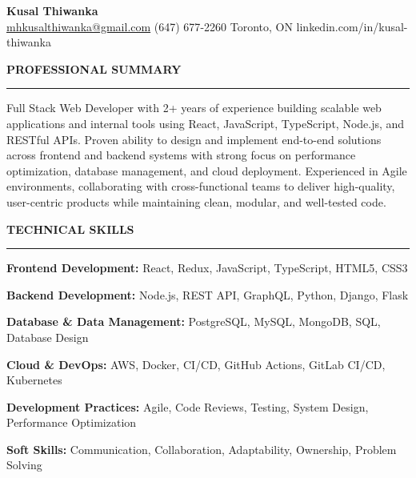 \documentclass[10pt,letterpaper]{article}
\begin{document}
\begin{center}
{\LARGE\textbf{Kusal Thiwanka}}\\[3pt]
\href{mailto:mhkusalthiwanka@gmail.com}{mhkusalthiwanka@gmail.com}\hspace{2em}%
(647) 677{-}2260\hspace{2em}%
Toronto, ON\hspace{2em}
linkedin.com/in/kusal-thiwanka
\end{center}

\vspace{6pt}

\textbf{PROFESSIONAL SUMMARY}\\[-8pt]
\noindent\rule{\textwidth}{1pt}

\vspace{-2pt}

Full Stack Web Developer with 2+ years of experience building scalable web applications and internal tools using React, JavaScript, TypeScript, Node.js, and RESTful APIs. Proven ability to design and implement end-to-end solutions across frontend and backend systems with strong focus on performance optimization, database management, and cloud deployment. Experienced in Agile environments, collaborating with cross-functional teams to deliver high-quality, user-centric products while maintaining clean, modular, and well-tested code.

\vspace{8pt}

\textbf{TECHNICAL SKILLS}\\[-8pt]
\noindent\rule{\textwidth}{1pt}

\vspace{-2pt}

\textbf{Frontend Development:} React, Redux, JavaScript, TypeScript, HTML5, CSS3

\textbf{Backend Development:} Node.js, REST API, GraphQL, Python, Django, Flask

\textbf{Database \& Data Management:} PostgreSQL, MySQL, MongoDB, SQL, Database Design

\textbf{Cloud \& DevOps:} AWS, Docker, CI/CD, GitHub Actions, GitLab CI/CD, Kubernetes

\textbf{Development Practices:} Agile, Code Reviews, Testing, System Design, Performance Optimization

\textbf{Soft Skills:} Communication, Collaboration, Adaptability, Ownership, Problem Solving

\vspace{8pt}
\end{document}
